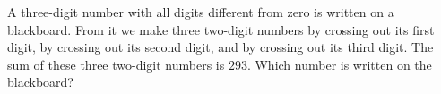 A three-digit number with all digits different from zero is written on a blackboard. From it we make three two-digit numbers by crossing out its first digit, by crossing out its second digit, and by crossing out its third digit. The sum of these three two-digit numbers is $293$. Which number is written on the blackboard?
